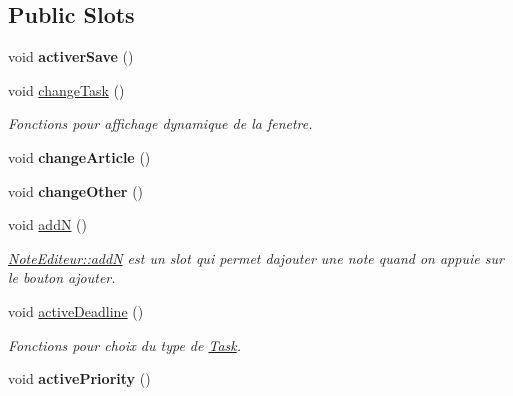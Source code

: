 \subsection*{Public Slots}
\begin{DoxyCompactItemize}
\item 
\mbox{\label{classNoteEditeur_a12249507c903d174ae601819aa39d53f}} 
void {\bfseries activer\+Save} ()
\item 
\mbox{\label{classNoteEditeur_a5f685f37877602be3363112f815b0b3d}} 
void \hyperlink{classNoteEditeur_a5f685f37877602be3363112f815b0b3d}{change\+Task} ()
\begin{DoxyCompactList}\small\item\em Fonctions pour affichage dynamique de la fenetre. \end{DoxyCompactList}\item 
\mbox{\label{classNoteEditeur_a3da3fe0faf9c1a77020128910239a764}} 
void {\bfseries change\+Article} ()
\item 
\mbox{\label{classNoteEditeur_a7cd73f506dbe35c256df0c3d71774c32}} 
void {\bfseries change\+Other} ()
\item 
\mbox{\label{classNoteEditeur_a41c3757412c596768e056e8a293b7c61}} 
void \hyperlink{classNoteEditeur_a41c3757412c596768e056e8a293b7c61}{addN} ()
\begin{DoxyCompactList}\small\item\em \hyperlink{classNoteEditeur_a41c3757412c596768e056e8a293b7c61}{Note\+Editeur\+::addN} est un slot qui permet d\textquotesingle{}ajouter une note quand on appuie sur le bouton ajouter. \end{DoxyCompactList}\item 
\mbox{\label{classNoteEditeur_a62089b5508a38889f4885043878cb805}} 
void \hyperlink{classNoteEditeur_a62089b5508a38889f4885043878cb805}{active\+Deadline} ()
\begin{DoxyCompactList}\small\item\em Fonctions pour choix du type de \hyperlink{classTask}{Task}. \end{DoxyCompactList}\item 
\mbox{\label{classNoteEditeur_ac8a518a3d52c18dbf17ec8a02c98ffa6}} 
void {\bfseries active\+Priority} ()
\end{DoxyCompactItemize}
